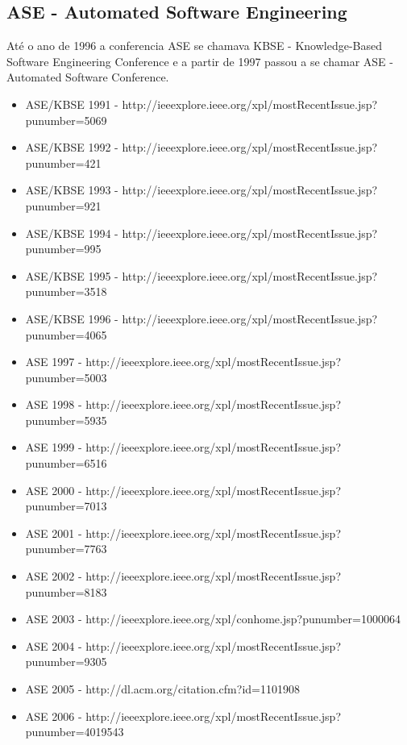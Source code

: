 \subsection{ASE - Automated Software Engineering}

Até o ano de 1996 a conferencia ASE se chamava KBSE - Knowledge-Based Software
Engineering Conference e a partir de 1997 passou a se chamar ASE - Automated
Software Conference.

\begin{itemize}
  \item ASE/KBSE 1991 - {\small http://ieeexplore.ieee.org/xpl/mostRecentIssue.jsp?punumber=5069}
  \item ASE/KBSE 1992 - {\small http://ieeexplore.ieee.org/xpl/mostRecentIssue.jsp?punumber=421}
  \item ASE/KBSE 1993 - {\small http://ieeexplore.ieee.org/xpl/mostRecentIssue.jsp?punumber=921}
  \item ASE/KBSE 1994 - {\small http://ieeexplore.ieee.org/xpl/mostRecentIssue.jsp?punumber=995}
  \item ASE/KBSE 1995 - {\small http://ieeexplore.ieee.org/xpl/mostRecentIssue.jsp?punumber=3518}
  \item ASE/KBSE 1996 - {\small http://ieeexplore.ieee.org/xpl/mostRecentIssue.jsp?punumber=4065}
  \item ASE 1997 - {\small http://ieeexplore.ieee.org/xpl/mostRecentIssue.jsp?punumber=5003}
  \item ASE 1998 - {\small http://ieeexplore.ieee.org/xpl/mostRecentIssue.jsp?punumber=5935}
  \item ASE 1999 - {\small http://ieeexplore.ieee.org/xpl/mostRecentIssue.jsp?punumber=6516}
  \item ASE 2000 - {\small http://ieeexplore.ieee.org/xpl/mostRecentIssue.jsp?punumber=7013}
  \item ASE 2001 - {\small http://ieeexplore.ieee.org/xpl/mostRecentIssue.jsp?punumber=7763}
  \item ASE 2002 - {\small http://ieeexplore.ieee.org/xpl/mostRecentIssue.jsp?punumber=8183}
  \item ASE 2003 - {\small http://ieeexplore.ieee.org/xpl/conhome.jsp?punumber=1000064}
  \item ASE 2004 - {\small http://ieeexplore.ieee.org/xpl/mostRecentIssue.jsp?punumber=9305}
  \item ASE 2005 - {\small http://dl.acm.org/citation.cfm?id=1101908}
  \item ASE 2006 - {\small http://ieeexplore.ieee.org/xpl/mostRecentIssue.jsp?punumber=4019543}

\end{itemize}
